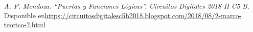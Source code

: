 
\begin{thebibliography}{99}
    \textit{A. P. Mendoza. “Puertas y Funciones Lógicas”. Circuitos Digitales 2018-II C5 B.} Disponible en\url{https://circuitosdigitalesc5b2018.blogspot.com/2018/08/2-marco-teorico-2.html}
\end{thebibliography}